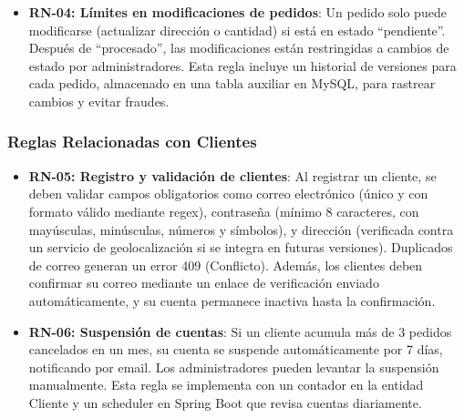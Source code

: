\documentclass[a4paper,12pt]{article}
\begin{document}
\begin{itemize}
    \item \textbf{RN-04: Límites en modificaciones de pedidos}: Un pedido solo puede modificarse (actualizar dirección o cantidad) si está en estado ``pendiente''. Después de ``procesado'', las modificaciones están restringidas a cambios de estado por administradores. Esta regla incluye un historial de versiones para cada pedido, almacenado en una tabla auxiliar en MySQL, para rastrear cambios y evitar fraudes.
\end{itemize}

\subsubsection{Reglas Relacionadas con Clientes}
\begin{itemize}
    \item \textbf{RN-05: Registro y validación de clientes}: Al registrar un cliente, se deben validar campos obligatorios como correo electrónico (único y con formato válido mediante regex), contraseña (mínimo 8 caracteres, con mayúsculas, minúsculas, números y símbolos), y dirección (verificada contra un servicio de geolocalización si se integra en futuras versiones). Duplicados de correo generan un error 409 (Conflicto). Además, los clientes deben confirmar su correo mediante un enlace de verificación enviado automáticamente, y su cuenta permanece inactiva hasta la confirmación.
    
    \item \textbf{RN-06: Suspensión de cuentas}: Si un cliente acumula más de 3 pedidos cancelados en un mes, su cuenta se suspende automáticamente por 7 días, notificando por email. Los administradores pueden levantar la suspensión manualmente. Esta regla se implementa con un contador en la entidad Cliente y un scheduler en Spring Boot que revisa cuentas diariamente.
\end{itemize}
\end{document}
